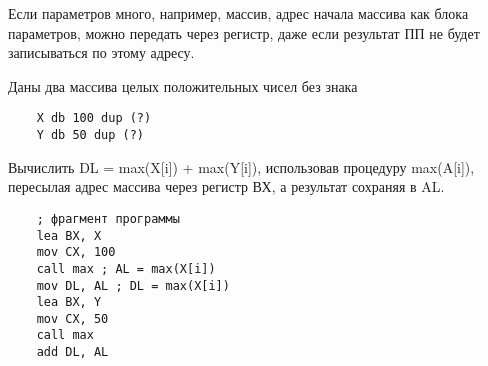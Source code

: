 Если параметров много, например, массив, адрес начала массива как блока параметров, можно передать через регистр, даже если результат ПП не будет записываться по этому адресу.

Даны два массива целых положительных чисел без знака
\begin{verbatim}
    X db 100 dup (?)
    Y db 50 dup (?)
\end{verbatim}

Вычислить DL = max(X[i]) + max(Y[i]), использовав процедуру max(A[i]), пересылая адрес массива через регистр ВХ, а результат сохраняя в AL.
\begin{verbatim}
    ; фрагмент программы
    lea BX, X
    mov CX, 100
    call max ; AL = max(X[i])
    mov DL, AL ; DL = max(X[i])
    lea BX, Y
    mov CX, 50
    call max
    add DL, AL
\end{verbatim}